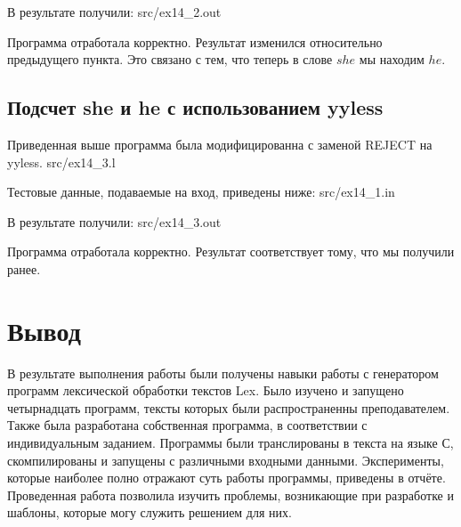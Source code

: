     В результате получили:
     {src/ex14_2.out}

    Программа отработала корректно. Результат изменился относительно предыдущего пункта. Это связано с тем, что теперь в слове $she$ мы находим $he$.

\subsection{Подсчет she и he с использованием yyless}

    Приведенная выше программа была модифицированна с заменой REJECT на yyless.
     {src/ex14_3.l}

    Тестовые данные, подаваемые на вход, приведены ниже:
     {src/ex14_1.in}
    
    В результате получили:
     {src/ex14_3.out}

    Программа отработала корректно. Результат соответствует тому, что мы получили ранее.


\section{Вывод}

В результате выполнения работы были получены навыки работы с генератором программ лексической обработки текстов Lex. 
Было изучено и запущено четырнадцать программ, тексты которых были распространенны преподавателем. Также была разработана собственная программа,
в соответствии с индивидуальным заданием. 
Программы были транслированы в текста на языке С, скомпилированы и запущены с различными входными данными. Эксперименты, которые наиболее полно
отражают суть работы программы, приведены в отчёте.
Проведенная работа позволила изучить проблемы, возникающие при разработке и шаблоны,
которые могу служить решением для них.


